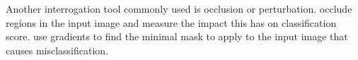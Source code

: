   Another interrogation tool commonly used is occlusion or perturbation. 
  \cite{zeiler_visualizing_2014} occlude regions in the
  input image and measure the impact this has on classification score.
  \cite{fong_interpretable_2017} use gradients to find the minimal mask to apply
  to the input image that causes misclassification.

